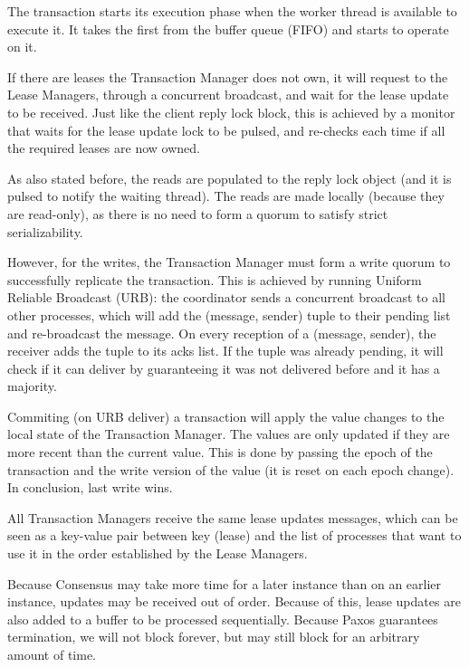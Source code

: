 \documentclass[times, 10pt,twocolumn]{article}
\begin{document}
The transaction starts its execution phase when the worker thread is available to execute it.
It takes the first from the buffer queue (FIFO) and starts to operate on it.

If there are leases the Transaction Manager does not own, it will request to the Lease Managers,
through a concurrent broadcast, and wait for the lease update to be received. Just like the client reply lock block,
this is achieved by a monitor that waits for the lease update lock to be pulsed, and re-checks each time
if all the required leases are now owned.

As also stated before, the reads are populated to the reply lock object (and it is pulsed to notify the waiting thread).
The reads are made locally (because they are read-only), as there is no need to form a quorum to satisfy strict serializability.

However, for the writes, the Transaction Manager must form a write quorum to successfully replicate the transaction.
This is achieved by running Uniform Reliable Broadcast \cite{URB} (URB): the coordinator sends a concurrent broadcast
to all other processes, which will add the (message, sender) tuple to their pending list and re-broadcast
the message. On every reception of a (message, sender), the receiver adds the tuple to its acks list.
If the tuple was already pending, it will check if it can deliver by guaranteeing it was not delivered
before and it has a majority.

Commiting (on URB deliver) a transaction will apply the value changes to the local state of the Transaction Manager.
The values are only updated if they are more recent than the current value. This is done by passing the
epoch of the transaction and the write version of the value (it is reset on each epoch change).
In conclusion, last write wins.

All Transaction Managers receive the same lease updates messages, which can be seen as a key-value pair between
key (lease) and the list of processes that want to use it in the order established by the Lease Managers.

Because Consensus may take more time for a later instance than on an earlier instance, updates may be received
out of order. Because of this, lease updates are also added to a buffer to be processed sequentially.
Because Paxos guarantees termination, we will not block forever, but may still block for an arbitrary amount of time.
\end{document}
